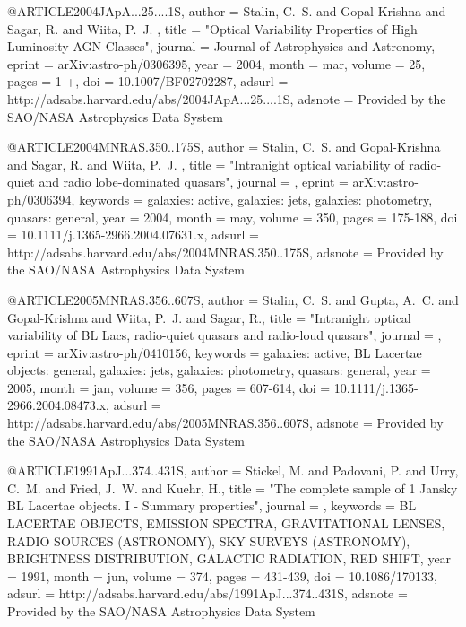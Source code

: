 \documentclass[twocolumn]{aastex62}
\begin{document}
{{{{{@ARTICLE{2004JApA...25....1S,
   author = {{Stalin}, C.~S. and {Gopal Krishna} and {Sagar}, R. and {Wiita}, P.~J.
	},
    title = "{Optical Variability Properties of High Luminosity AGN Classes}",
  journal = {Journal of Astrophysics and Astronomy},
   eprint = {arXiv:astro-ph/0306395},
     year = 2004,
    month = mar,
   volume = 25,
    pages = {1-+},
      doi = {10.1007/BF02702287},
   adsurl = {http://adsabs.harvard.edu/abs/2004JApA...25....1S},
  adsnote = {Provided by the SAO/NASA Astrophysics Data System}
}


@ARTICLE{2004MNRAS.350..175S,
   author = {{Stalin}, C.~S. and {Gopal-Krishna} and {Sagar}, R. and {Wiita}, P.~J.
	},
    title = "{Intranight optical variability of radio-quiet and radio lobe-dominated quasars}",
  journal = {\mnras},
   eprint = {arXiv:astro-ph/0306394},
 keywords = {galaxies: active, galaxies: jets, galaxies: photometry, quasars: general},
     year = 2004,
    month = may,
   volume = 350,
    pages = {175-188},
      doi = {10.1111/j.1365-2966.2004.07631.x},
   adsurl = {http://adsabs.harvard.edu/abs/2004MNRAS.350..175S},
  adsnote = {Provided by the SAO/NASA Astrophysics Data System}
}


@ARTICLE{2005MNRAS.356..607S,
   author = {{Stalin}, C.~S. and {Gupta}, A.~C. and {Gopal-Krishna} and {Wiita}, P.~J. and 
	{Sagar}, R.},
    title = "{Intranight optical variability of BL Lacs, radio-quiet quasars and radio-loud quasars}",
  journal = {\mnras},
   eprint = {arXiv:astro-ph/0410156},
 keywords = {galaxies: active, BL Lacertae objects: general, galaxies: jets, galaxies: photometry, quasars: general},
     year = 2005,
    month = jan,
   volume = 356,
    pages = {607-614},
      doi = {10.1111/j.1365-2966.2004.08473.x},
   adsurl = {http://adsabs.harvard.edu/abs/2005MNRAS.356..607S},
  adsnote = {Provided by the SAO/NASA Astrophysics Data System}
}


@ARTICLE{1991ApJ...374..431S,
   author = {{Stickel}, M. and {Padovani}, P. and {Urry}, C.~M. and {Fried}, J.~W. and 
	{Kuehr}, H.},
    title = "{The complete sample of 1 Jansky BL Lacertae objects. I - Summary properties}",
  journal = {\apj},
 keywords = {BL LACERTAE OBJECTS, EMISSION SPECTRA, GRAVITATIONAL LENSES, RADIO SOURCES (ASTRONOMY), SKY SURVEYS (ASTRONOMY), BRIGHTNESS DISTRIBUTION, GALACTIC RADIATION, RED SHIFT},
     year = 1991,
    month = jun,
   volume = 374,
    pages = {431-439},
      doi = {10.1086/170133},
   adsurl = {http://adsabs.harvard.edu/abs/1991ApJ...374..431S},
  adsnote = {Provided by the SAO/NASA Astrophysics Data System}
}


}}}}}
\end{document}
